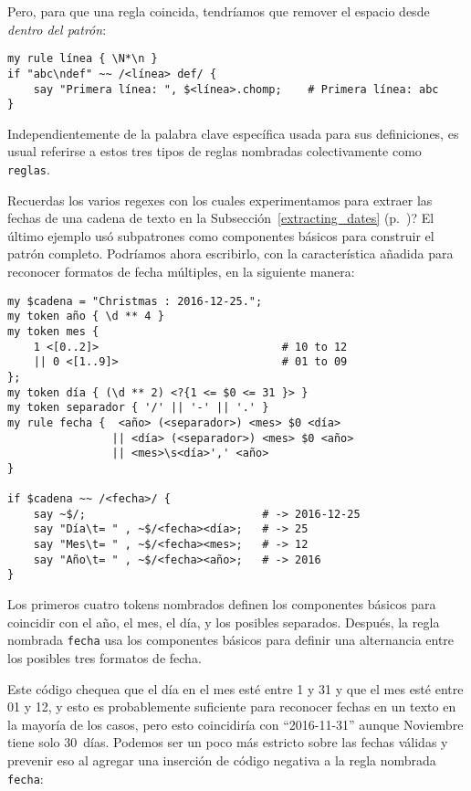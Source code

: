 Pero, para que una regla coincida, tendríamos que remover 
el espacio desde \emph{dentro del patrón}:

\begin{lstlisting}
my rule línea { \N*\n }
if "abc\ndef" ~~ /<línea> def/ {
    say "Primera línea: ", $<línea>.chomp;    # Primera línea: abc
}
\end{lstlisting} 

Independientemente de la palabra clave específica usada
para sus definiciones, es usual referirse a estos tres tipos
de reglas nombradas colectivamente como {\tt reglas}.

Recuerdas los varios regexes con los cuales
experimentamos para extraer las fechas de una cadena de
texto en la Subsección~\ref{extracting_dates} 
(p.~\pageref{extracting_dates})? El último ejemplo
usó subpatrones como componentes básicos para 
construir el patrón completo. Podríamos ahora escribirlo,
con la característica añadida para reconocer formatos de
fecha múltiples, en la siguiente manera:

\begin{lstlisting}
my $cadena = "Christmas : 2016-12-25.";                                         
my token año { \d ** 4 }                                        
my token mes {   
    1 <[0..2]>                            # 10 to 12                     
    || 0 <[1..9]>                         # 01 to 09                     
};
my token día { (\d ** 2) <?{1 <= $0 <= 31 }> }  
my token separador { '/' || '-' || '.' } 
my rule fecha {  <año> (<separador>) <mes> $0 <día> 
                || <día> (<separador>) <mes> $0 <año> 
                || <mes>\s<día>',' <año>
}                         

if $cadena ~~ /<fecha>/ {
    say ~$/;                           # -> 2016-12-25
    say "Día\t= " , ~$/<fecha><día>;   # -> 25
    say "Mes\t= " , ~$/<fecha><mes>;   # -> 12
    say "Año\t= " , ~$/<fecha><año>;   # -> 2016
}          
\end{lstlisting} 

Los primeros cuatro tokens nombrados definen los componentes
básicos para coincidir con el año, el mes, el día, y los posibles
separados. Después, la regla nombrada {\tt fecha} usa los 
componentes básicos para definir una alternancia entre los 
posibles tres formatos de fecha.

Este código chequea que el día en el mes esté entre 1 y 31
y que el mes esté entre 01 y 12, y esto es probablemente
suficiente para reconocer fechas en un texto en la 
mayoría de los casos, pero esto coincidiría con ``2016-11-31''
aunque Noviembre tiene solo 30~días. Podemos ser un poco
más estricto sobre las fechas válidas y prevenir eso al
agregar una inserción de código negativa a la regla nombrada
{\tt fecha}:


